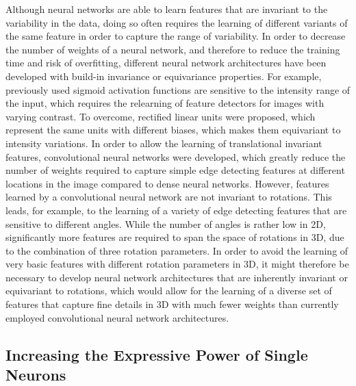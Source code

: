 Although neural networks are able to learn features that are invariant to the
variability in the data, doing so often requires the learning of different
variants of the same feature in order to capture the range of variability. In
order to decrease the number of weights of a neural network, and therefore to
reduce the training time and risk of overfitting, different neural network
architectures have been developed with build-in invariance or equivariance
properties. For example, previously used sigmoid activation functions are
sensitive to the intensity range of the input, which requires the relearning of
feature detectors for images with varying contrast. To overcome, rectified
linear units were proposed, which represent the same units with different
biases, which makes them equivariant to intensity variations. In order to allow
the learning of translational invariant features, convolutional neural networks
were developed, which greatly reduce the number of weights required to capture
simple edge detecting features at different locations in the image compared to
dense neural networks. However, features learned by a convolutional neural
network are not invariant to rotations. This leads, for example, to the learning
of a variety of edge detecting features that are sensitive to different angles.
While the number of angles is rather low in 2D, significantly more features are
required to span the space of rotations in 3D, due to the combination of three
rotation parameters. In order to avoid the learning of very basic features with
different rotation parameters in 3D, it might therefore be necessary to develop
neural network architectures that are inherently invariant or equivariant to
rotations, which would allow for the learning of a diverse set of features that
capture fine details in 3D with much fewer weights than currently employed
convolutional neural network architectures.

\subsection[Increasing the expressive power of single neurons]{Increasing the
Expressive Power of Single Neurons}

